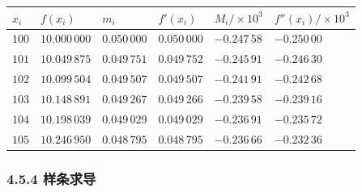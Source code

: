 {\def\LTcaptype{none} %
\begin{longtable}[]{@{}
  >{\raggedleft\arraybackslash}p{}
  >{\raggedleft\arraybackslash}p{}
  >{\raggedleft\arraybackslash}p{}
  >{\raggedleft\arraybackslash}p{}
  >{\raggedleft\arraybackslash}p{}
  >{\raggedleft\arraybackslash}p{}@{}}
\toprule\noalign{}
\begin{minipage}[b]{\linewidth}\raggedleft
\(x_i\)
\end{minipage} & \begin{minipage}[b]{\linewidth}\raggedleft
\(f(x_i)\)
\end{minipage} & \begin{minipage}[b]{\linewidth}\raggedleft
\(m_i\)
\end{minipage} & \begin{minipage}[b]{\linewidth}\raggedleft
\(f'(x_i)\)
\end{minipage} & \begin{minipage}[b]{\linewidth}\raggedleft
\(M_i/\times10^3\)
\end{minipage} & \begin{minipage}[b]{\linewidth}\raggedleft
\(f''(x_i)/\times10^3\)
\end{minipage} \\
\midrule\noalign{}
\endhead
\bottomrule\noalign{}
\endlastfoot
\(100\) & \(10.000\,000\) & \(0.050\,000\) & \(0.050\,000\) & \(-0.247\,58\) & \(-0.250\,00\) \\
\(101\) & \(10.049\,875\) & \(0.049\,751\) & \(0.049\,752\) & \(-0.245\,91\) & \(-0.246\,30\) \\
\(102\) & \(10.099\,504\) & \(0.049\,507\) & \(0.049\,507\) & \(-0.241\,91\) & \(-0.242\,68\) \\
\(103\) & \(10.148\,891\) & \(0.049\,267\) & \(0.049\,266\) & \(-0.239\,58\) & \(-0.239\,16\) \\
\(104\) & \(10.198\,039\) & \(0.049\,029\) & \(0.049\,029\) & \(-0.236\,91\) & \(-0.235\,72\) \\
\(105\) & \(10.246\,950\) & \(0.048\,795\) & \(0.048\,795\) & \(-0.236\,66\) & \(-0.232\,36\) \\
\end{longtable}
}

\subsubsection{4.5.4 样条求导}\label{ch04b-ux6837ux6761ux6c42ux5bfc}

